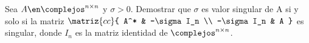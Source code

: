 \begin{enunciado}{\ejercicio}
  Sea $A \en \complejos^{n \times n}$ y $\sigma > 0$. Demostrar que $\sigma$ es valor singular de A
  si y solo si la matriz
  $\matriz{cc}{
      A^* & -\sigma I_n \\
      -\sigma I_n & A
    }$
  es singular, donde $I_n$ es la matriz identidad de $\complejos^{n \times n}$.
\end{enunciado}
\hacer
